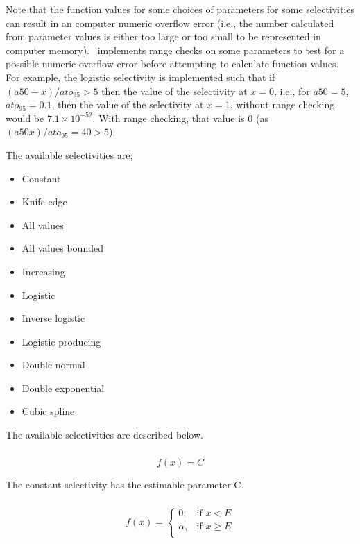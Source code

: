Note that the function values for some choices of parameters for some selectivities can result in an computer numeric overflow error (i.e., the number calculated from parameter values is either too large or too small to be represented in computer memory). \CAS\ implements range checks on some parameters to test for a possible numeric overflow error before attempting to calculate function values. For example, the logistic selectivity is implemented such that if $(a50-x)/ato_95 > 5$ then the value of the selectivity at $x=0$, i.e., for $a50=5$, $ato_95=0.1$, then the value of the selectivity at $x=1$, without range checking would be $7.1 \times 10^{-52}$. With range checking, that value is $0$ (as $(a50 x)/ato_95=40 > 5$).

The available selectivities are;

\begin{itemize}
  \item Constant
  \item Knife-edge
  \item All values
  \item All values bounded
  \item Increasing
  \item Logistic
	\item Inverse logistic
  \item Logistic producing
  \item Double normal
  \item Double exponential
	\item Cubic spline
\end{itemize}

The available selectivities are described below.

\subsubsection[Constant]{}

\begin{equation}
f(x)=C
\end{equation}

The constant selectivity has the estimable parameter C. 

\subsubsection[Knife-edge]{}

\begin{equation}
f(x)= \begin{cases}
  0, & \text{if $x < E$} \\
  \alpha, & \text{if $x \ge E$}\\ 
  \end{cases} 
\end{equation}

